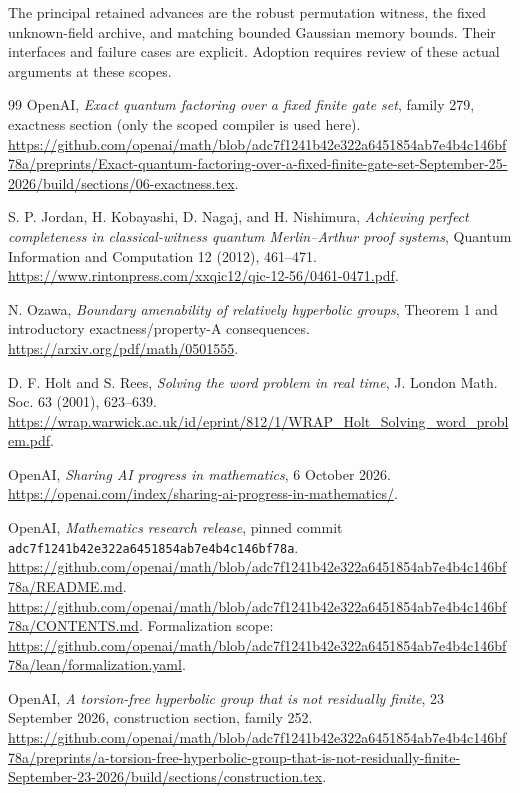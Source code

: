 \documentclass[11pt]{article}
\theoremstyle{definition}
\begin{document}
The principal retained advances are the robust permutation witness,
the fixed unknown-field archive, and matching bounded Gaussian
memory bounds. Their interfaces and failure cases are explicit.
Adoption requires review of these actual arguments at these scopes.
\begin{thebibliography}{99}
OpenAI, \emph{Exact quantum factoring over a fixed finite gate set},
family 279, exactness section (only the scoped compiler is used here).
\url{https://github.com/openai/math/blob/adc7f1241b42e322a6451854ab7e4b4c146bf78a/preprints/Exact-quantum-factoring-over-a-fixed-finite-gate-set-September-25-2026/build/sections/06-exactness.tex}.

S. P. Jordan, H. Kobayashi, D. Nagaj, and H. Nishimura,
\emph{Achieving perfect completeness in classical-witness quantum
Merlin--Arthur proof systems}, Quantum Information and Computation
12 (2012), 461--471.
\url{https://www.rintonpress.com/xxqic12/qic-12-56/0461-0471.pdf}.

N. Ozawa, \emph{Boundary amenability of relatively hyperbolic groups},
Theorem 1 and introductory exactness/property-A consequences.
\url{https://arxiv.org/pdf/math/0501555}.

D. F. Holt and S. Rees, \emph{Solving the word problem in real time},
J. London Math. Soc. 63 (2001), 623--639.
\url{https://wrap.warwick.ac.uk/id/eprint/812/1/WRAP_Holt_Solving_word_problem.pdf}.

OpenAI, \emph{Sharing AI progress in mathematics}, 6 October 2026.
\url{https://openai.com/index/sharing-ai-progress-in-mathematics/}.

OpenAI, \emph{Mathematics research release}, pinned commit
\texttt{adc7f1241b42e322a6451854ab7e4b4c146bf78a}.
\url{https://github.com/openai/math/blob/adc7f1241b42e322a6451854ab7e4b4c146bf78a/README.md}.
\url{https://github.com/openai/math/blob/adc7f1241b42e322a6451854ab7e4b4c146bf78a/CONTENTS.md}.
Formalization scope:
\url{https://github.com/openai/math/blob/adc7f1241b42e322a6451854ab7e4b4c146bf78a/lean/formalization.yaml}.

OpenAI, \emph{A torsion-free hyperbolic group that is not residually finite},
23 September 2026, construction section, family 252.
\url{https://github.com/openai/math/blob/adc7f1241b42e322a6451854ab7e4b4c146bf78a/preprints/a-torsion-free-hyperbolic-group-that-is-not-residually-finite-September-23-2026/build/sections/construction.tex}.


\end{thebibliography}
\end{document}
